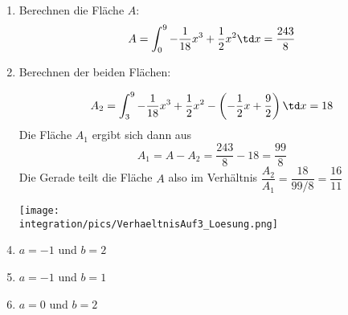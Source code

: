 \begin{Answer}[ref=verhaltnisFlaechenA3]\\
	\begin{enumerate}[label=\alph*)]
		\item Berechnen die Fläche \(A\):
		\[A=\int_0^9 -\frac{1}{18}x^3+\frac{1}{2}x^2 \td x=\frac{243}{8}\]
		\item Berechnen der beiden Flächen:\\
		\begin{minipage}{\textwidth}
			\begin{minipage}{.5\textwidth}\raggedright
				\[A_2=\int_3^9 -\frac{1}{18}x^3+\frac{1}{2}x^2-\left(-\frac{1}{2}x+\frac{9}{2}\right) \td x=18\]
				Die Fläche \(A_1\) ergibt sich dann aus
				\[A_1=A-A_2=\frac{243}{8}-18=\frac{99}{8}\]
				Die Gerade teilt die Fläche \(A\) also im Verhältnis \(\dfrac{A_2}{A_1}=\dfrac{18}{99/8}=\dfrac{16}{11}\)
			\end{minipage}
			\begin{minipage}{.5\textwidth}
				\texttt{[image: \\integration/pics/VerhaeltnisAuf3\_Loesung.png]}
			\end{minipage}
		\end{minipage}	
	\end{enumerate}
\end{Answer}


\begin{enumerate}[label=\alph*)]
\setcounter{enumi}{3}
\item \(a=-1\) und \(b=2\)
\item \(a=-1\) und \(b=1\)
\item \(a=0\) und \(b=2\)
\end{enumerate}


